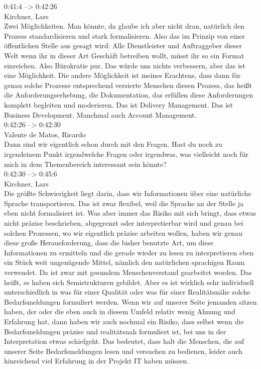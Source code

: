 0:41:4 --> 0:42:26\\
Kirchner, Lars\\
Zwei Möglichkeiten. Man könnte, da glaube ich aber nicht dran, natürlich den Prozess standardisieren und stark formalisieren. Also das im Prinzip von einer öffentlichen Stelle aus gesagt wird: Alle Dienstleister und Auftraggeber dieser Welt wenn ihr in dieser Art Geschäft betreiben wollt, müsst ihr so ein Format einreichen. Also Bürokratie pur. Das würde uns nichts verbessern, aber das ist eine Möglichkeit. Die andere Möglichkeit ist meines Erachtens, dass dann für genau solche Prozesse entsprechend versierte Menschen diesen Prozess, das heißt die Anforderungserhebung, die Dokumentation, das erfüllen diese Anforderungen komplett begleiten und moderieren. Das ist Delivery Management. Das ist Business Development. Manchmal auch Account Management.\\

0:42:26 --> 0:42:30\\
Valente de Matos, Ricardo\\
Dann sind wir eigentlich schon durch mit den Fragen. Hast du noch zu irgendeinem Punkt irgendwelche Fragen oder irgendwas, was vielleicht noch für mich in dem Themenbereich interessant sein könnte?\\

0:42:30 --> 0:45:6\\
Kirchner, Lars\\
Die größte Schwierigkeit liegt darin, dass wir Informationen über eine natürliche Sprache transportieren. Das ist zwar flexibel, weil die Sprache an der Stelle ja eben nicht formalisiert ist. Was aber immer das Risiko mit sich bringt, dass etwas nicht präzise beschrieben, abgegrenzt oder interpretierbar wird und genau bei solchen Prozessen, wo wir eigentlich präzise arbeiten wollen, haben wir genau diese große Herausforderung, dass die bisher benutzte Art, um diese Informationen zu ermitteln und die gerade wieder zu lesen zu interpretieren eben ein Stück weit ungenügende Mittel, nämlich den natürlichen sprachigen Raum verwendet. Da ist zwar mit gesundem Menschenverstand gearbeitet worden. Das heißt, es haben sich Semistrukturen gebildet. Aber es ist wirklich sehr individuell unterschiedlich in was für einer Qualität oder was für einer Realitätsnähe solche Bedarfsmeldungen formuliert werden. Wenn wir auf unserer Seite jemanden sitzen haben, der oder die eben auch in diesem Umfeld relativ wenig Ahnung und Erfahrung hat, dann haben wir auch nochmal ein Risiko, dass selbst wenn die Bedarfsmeldungen präzise und realitätsnah formuliert ist, bei uns in der Interpretation etwas schiefgeht. Das bedeutet, dass halt die Menschen, die auf unserer Seite Bedarfsmeldungen lesen und versuchen zu bedienen, leider auch hinreichend viel Erfahrung in der Projekt IT haben müssen.\\
